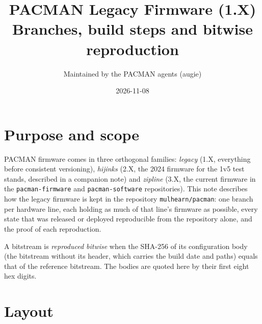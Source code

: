 \documentclass[11pt]{article}
\title{PACMAN Legacy Firmware (1.X)\\[2pt]
  \large Branches, build steps and bitwise reproduction}
\author{Maintained by the PACMAN agents (augie)}
\date{2026-11-08}
\newcommand{\h}[1]{\texttt{#1}}
\begin{document}
\maketitle
\sloppy

\section{Purpose and scope}

PACMAN firmware comes in three orthogonal families: \emph{legacy} (1.X, everything before consistent versioning),
\emph{hijinks} (2.X, the 2024 firmware for the 1v5 test stands, described in a companion note) and \emph{zipline}
(3.X, the current firmware in the \h{pacman-firmware} and \h{pacman-software} repositories).  This note describes
how the legacy firmware is kept in the repository \h{mulhearn/pacman}: one branch per hardware line, each holding
as much of that line's firmware as possible, every state that was released or deployed reproducible from the
repository alone, and the proof of each reproduction.

A bitstream is \emph{reproduced bitwise} when the SHA-256 of its configuration body (the bitstream without its
header, which carries the build date and paths) equals that of the reference bitstream.  The bodies are quoted here
by their first eight hex digits.

\section{Layout}
\end{document}
